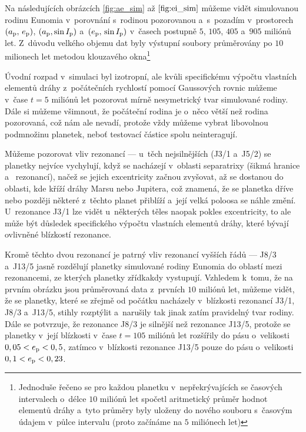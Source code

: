 \documentclass[A4paper, 12pt, oneside, openany]{book}
\begin{document}
Na následujících obrázcích \ref{fig:ae_sim} až $\ref{fig:ei_sim}$ můžeme vidět simulovanou rodinu Eunomia v~porovnání s~rodinou pozorovanou a~s~pozadím v~prostorech $(a_{\rm p},\,e_{\rm p})$, $(a_{\rm p}, \sin I_{\rm p})$ a~$(e_{\rm p},\,\sin I_{\rm p})$ v~časech postupně $5$, $105$, $405$ a~$905$ miliónů let. Z~důvodu velkého objemu dat byly výstupní soubory průměrovány po $10$ milionech let metodou klouzavého okna\footnote{Jednoduše řečeno se pro každou planetku v~nepřekrývajících se časových intervalech o~délce $10$ miliónů let spočetl aritmetický průměr hodnot elementů dráhy a~tyto průměry byly uloženy do nového souboru s~časovým údajem v~půlce intervalu (proto začínáme na $5$ miliónech let)}

Úvodní rozpad v~simulaci byl izotropní, ale kvůli specifickému výpočtu vlastních elementů dráhy z~počátečních rychlostí pomocí Gaussových rovnic můžeme v~čase $t=5$ miliónů let pozorovat mírně nesymetrický tvar simulované rodiny. Dále si můžeme všimnout, že počáteční rodina je o~něco větší než rodina pozorovaná, což nám ale nevadí, protože vždy můžeme vybrat libovolnou podmnožinu planetek, neboť testovací částice spolu neinteragují.

Můžeme pozorovat vliv rezonancí --- u~těch nejsilnějších (J3/1 a~J5/2) se planetky nejvíce vychylují, když se nacházejí v~oblasti separatrixy (šikmá hranice  a~ rezonancí), načež se jejich excentricity začnou zvyšovat, až se dostanou do oblasti, kde kříží dráhy Marsu nebo Jupitera, což znamená, že se planetka dříve nebo později některé z~těchto planet přiblíží a~její velká poloosa se náhle změní. U~rezonance J3/1 lze vidět u~některých těles naopak pokles excentricity, to ale může být důsledek specifického výpočtu vlastních elementů dráhy, které bývají ovlivněné blízkostí rezonance.

Kromě těchto dvou rezonancí je patrný vliv rezonancí vyšších řádů --- J8/3 a~J13/5 jasně rozdělují planetky simulované rodiny Eunomia do oblastí mezi rezonancemi, ze kterých planetky zřídkakdy vystupují. Vzhledem k~tomu, že na prvním obrázku jsou průměrovaná data z~prvních $10$ miliónů let, můžeme vidět, že se planetky, které se zřejmě od počátku nacházely v~blízkosti rezonancí J3/1, J8/3 a~J13/5, stihly rozptýlit a~narušily tak jinak zatím pravidelný tvar rodiny. Dále se potvrzuje, že rezonance J8/3 je silnější než rezonance J13/5, protože se planetky v~její blízkosti v~čase $t=105$ miliónů let rozšířily do pásu o~velikosti $0,05<e_{\rm p}<0,5$, zatímco v~blízkosti rezonance J13/5 pouze do pásu o~velikosti $0,1<e_{\rm p}<0,23$.
\end{document}
